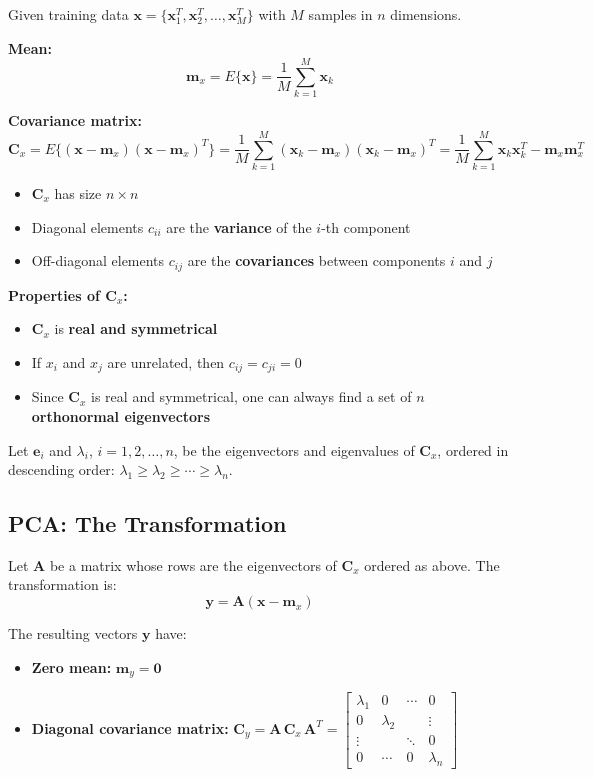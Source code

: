\documentclass[11pt,a4paper]{article}
\theoremstyle{definition}
\theoremstyle{plain}
\theoremstyle{remark}
\begin{document}
Given training data $\mathbf{x} = \{\mathbf{x}_1^T, \mathbf{x}_2^T, \ldots, \mathbf{x}_M^T\}$ with $M$ samples in $n$ dimensions.

\textbf{Mean:}
\[
\mathbf{m}_x = E\{\mathbf{x}\} = \frac{1}{M} \sum_{k=1}^{M} \mathbf{x}_k
\]

\textbf{Covariance matrix:}
\[
\mathbf{C}_x = E\{(\mathbf{x} - \mathbf{m}_x)(\mathbf{x} - \mathbf{m}_x)^T\} = \frac{1}{M} \sum_{k=1}^{M} (\mathbf{x}_k - \mathbf{m}_x)(\mathbf{x}_k - \mathbf{m}_x)^T = \frac{1}{M} \sum_{k=1}^{M} \mathbf{x}_k \mathbf{x}_k^T - \mathbf{m}_x \mathbf{m}_x^T
\]

\begin{itemize}
    \item $\mathbf{C}_x$ has size $n \times n$
    \item Diagonal elements $c_{ii}$ are the \textbf{variance} of the $i$-th component
    \item Off-diagonal elements $c_{ij}$ are the \textbf{covariances} between components $i$ and $j$
\end{itemize}

\textbf{Properties of $\mathbf{C}_x$:}
\begin{itemize}
    \item $\mathbf{C}_x$ is \textbf{real and symmetrical}
    \item If $x_i$ and $x_j$ are unrelated, then $c_{ij} = c_{ji} = 0$
    \item Since $\mathbf{C}_x$ is real and symmetrical, one can always find a set of $n$ \textbf{orthonormal eigenvectors}
\end{itemize}

Let $\mathbf{e}_i$ and $\lambda_i$, $i = 1, 2, \ldots, n$, be the eigenvectors and eigenvalues of $\mathbf{C}_x$, ordered in descending order: $\lambda_1 \geq \lambda_2 \geq \cdots \geq \lambda_n$.

\subsection{PCA: The Transformation}

Let $\mathbf{A}$ be a matrix whose rows are the eigenvectors of $\mathbf{C}_x$ ordered as above. The transformation is:
\[
\mathbf{y} = \mathbf{A}(\mathbf{x} - \mathbf{m}_x)
\]

The resulting vectors $\mathbf{y}$ have:
\begin{itemize}
    \item \textbf{Zero mean:} $\mathbf{m}_y = \mathbf{0}$
    \item \textbf{Diagonal covariance matrix:} $\mathbf{C}_y = \mathbf{A} \, \mathbf{C}_x \, \mathbf{A}^T = \begin{bmatrix} \lambda_1 & 0 & \cdots & 0 \\ 0 & \lambda_2 & & \vdots \\ \vdots & & \ddots & 0 \\ 0 & \cdots & 0 & \lambda_n \end{bmatrix}$
\end{itemize}
\end{document}
